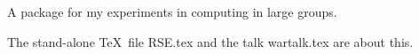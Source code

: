 

A package for my experiments in computing in large groups.



The stand-alone \TeX\ file RSE.tex and the talk wartalk.tex are about this.



